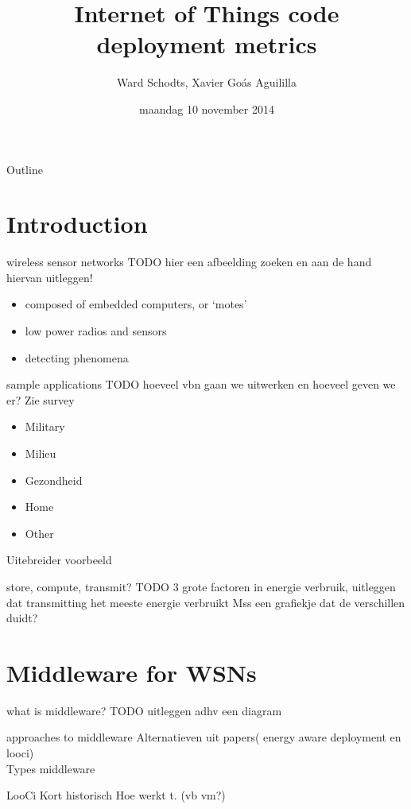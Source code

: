 \documentclass[presentation]{beamer}
\author{Ward Schodts, Xavier Goás Aguililla}
\date{maandag 10 november 2014}
\title{Internet of Things code deployment metrics}
\begin{document}
\maketitle
\begin{frame}{Outline}
\tableofcontents
\end{frame}


\section{Introduction}
\label{sec-1}
\begin{frame}[label=sec-1-1]{wireless sensor networks}
TODO hier een afbeelding zoeken en aan de hand hiervan uitleggen!
\begin{itemize}

\item composed of embedded computers, or ‘motes’
\item low power radios and sensors 
\item detecting phenomena
\end{itemize}
\end{frame}
\begin{frame}[label=sec-1-2]{sample applications}
TODO hoeveel vbn gaan we uitwerken en hoeveel geven we er? Zie survey
\begin{itemize}
\item Military
\item Milieu
\item Gezondheid
\item Home
\item Other
\end{itemize}
\end{frame}
\begin{frame}[label=sec-1-3]{Uitebreider voorbeeld}
\end{frame}
\begin{frame}[label=sec-1-4]{store, compute, transmit?}
TODO 3 grote factoren in energie verbruik,
uitleggen dat transmitting het meeste energie verbruikt
Mss een grafiekje dat de verschillen duidt?
\end{frame}
\section{Middleware for WSNs}
\label{sec-2}
\begin{frame}[label=sec-2-1]{what is middleware?}
TODO uitleggen adhv een diagram
\end{frame}
\begin{frame}[label=sec-2-2]{approaches to middleware}
Alternatieven uit papers( energy aware deployment en looci)
\\
Types middleware
\end{frame}
\begin{frame}[label=sec-2-3]{LooCi}
Kort historisch
Hoe werkt t. (vb vm?)
\end{frame}
\end{document}
